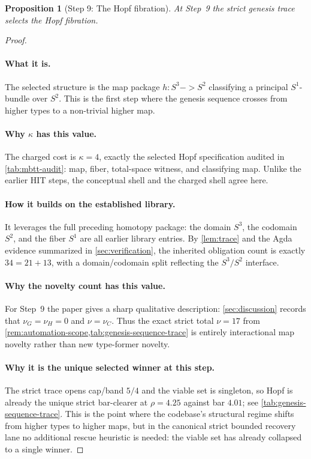 \documentclass[11pt,a4paper]{article}
\def\to{->}%
\theoremstyle{plain}
\newtheorem{proposition}[theorem]{Proposition}
\theoremstyle{definition}
\theoremstyle{remark}
\begin{document}
\begin{proposition}[Step 9: The Hopf fibration]
\label{prop:genesis-step9}
At Step~9 the strict genesis trace selects the Hopf fibration.
\end{proposition}

\begin{proof}
\paragraph{What it is.}
The selected structure is the map package
$h:S^3\to S^2$ classifying a principal $S^1$-bundle over $S^2$.
This is the first step where the genesis sequence crosses from higher types to a
non-trivial higher map.

\paragraph{Why $\kappa$ has this value.}
The charged cost is $\kappa=4$, exactly the selected Hopf specification audited
in \cref{tab:mbtt-audit}: map, fiber, total-space witness, and classifying map.
Unlike the earlier HIT steps, the conceptual shell and the charged shell agree
here.

\paragraph{How it builds on the established library.}
It leverages the full preceding homotopy package:
the domain $S^3$, the codomain $S^2$, and the fiber $S^1$ are all earlier
library entries.
By \cref{lem:trace} and the Agda evidence summarized in
\cref{sec:verification}, the inherited obligation count is exactly
$34=21+13$, with a domain/codomain split reflecting the $S^3/S^2$ interface.

\paragraph{Why the novelty count has this value.}
For Step~9 the paper gives a sharp qualitative description:
\cref{sec:discussion} records that $\nu_G=\nu_H=0$ and $\nu=\nu_C$.
Thus the exact strict total $\nu=17$ from
\cref{rem:automation-scope,tab:genesis-sequence-trace} is entirely interactional
map novelty rather than new type-former novelty.

\paragraph{Why it is the unique selected winner at this step.}
The strict trace opens cap/band $5/4$ and the viable set is singleton, so Hopf
is already the unique strict bar-clearer at $\rho=4.25$ against bar $4.01$; see
\cref{tab:genesis-sequence-trace}.
This is the point where the codebase's structural regime shifts from higher
types to higher maps, but in the canonical strict bounded recovery lane no additional rescue
heuristic is needed: the viable set has already collapsed to a single winner.
\end{proof}
\end{document}
